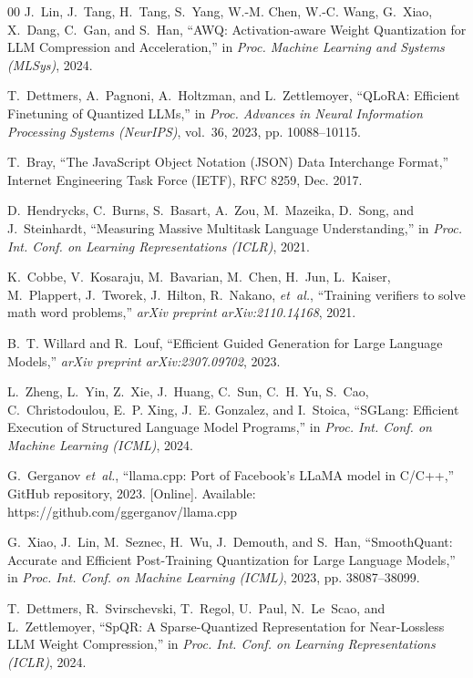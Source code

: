 \documentclass[conference]{IEEEtran}
\begin{document}
{\begin{thebibliography}{00}
J.~Lin, J.~Tang, H.~Tang, S.~Yang, W.-M. Chen, W.-C. Wang, G.~Xiao, X.~Dang, C.~Gan, and S.~Han, ``AWQ: Activation-aware Weight Quantization for LLM Compression and Acceleration,'' in \emph{Proc. Machine Learning and Systems (MLSys)}, 2024.

T.~Dettmers, A.~Pagnoni, A.~Holtzman, and L.~Zettlemoyer, ``QLoRA: Efficient Finetuning of Quantized LLMs,'' in \emph{Proc. Advances in Neural Information Processing Systems (NeurIPS)}, vol.~36, 2023, pp. 10088--10115.

T.~Bray, ``The JavaScript Object Notation (JSON) Data Interchange Format,'' Internet Engineering Task Force (IETF), RFC 8259, Dec. 2017.

D.~Hendrycks, C.~Burns, S.~Basart, A.~Zou, M.~Mazeika, D.~Song, and J.~Steinhardt, ``Measuring Massive Multitask Language Understanding,'' in \emph{Proc. Int. Conf. on Learning Representations (ICLR)}, 2021.

K.~Cobbe, V.~Kosaraju, M.~Bavarian, M.~Chen, H.~Jun, L.~Kaiser, M.~Plappert, J.~Tworek, J.~Hilton, R.~Nakano, \emph{et~al.}, ``Training verifiers to solve math word problems,'' \emph{arXiv preprint arXiv:2110.14168}, 2021.

B.~T. Willard and R.~Louf, ``Efficient Guided Generation for Large Language Models,'' \emph{arXiv preprint arXiv:2307.09702}, 2023.

L.~Zheng, L.~Yin, Z.~Xie, J.~Huang, C.~Sun, C.~H. Yu, S.~Cao, C.~Christodoulou, E.~P. Xing, J.~E. Gonzalez, and I.~Stoica, ``SGLang: Efficient Execution of Structured Language Model Programs,'' in \emph{Proc. Int. Conf. on Machine Learning (ICML)}, 2024.

G.~Gerganov \emph{et~al.}, ``llama.cpp: Port of Facebook's LLaMA model in C/C++,'' GitHub repository, 2023. [Online]. Available: https://github.com/ggerganov/llama.cpp

G.~Xiao, J.~Lin, M.~Seznec, H.~Wu, J.~Demouth, and S.~Han, ``SmoothQuant: Accurate and Efficient Post-Training Quantization for Large Language Models,'' in \emph{Proc. Int. Conf. on Machine Learning (ICML)}, 2023, pp. 38087--38099.

T.~Dettmers, R.~Svirschevski, T.~Regol, U.~Paul, N.~Le~Scao, and L.~Zettlemoyer, ``SpQR: A Sparse-Quantized Representation for Near-Lossless LLM Weight Compression,'' in \emph{Proc. Int. Conf. on Learning Representations (ICLR)}, 2024.


\end{thebibliography}}
\end{document}
